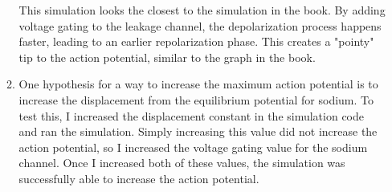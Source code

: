 \documentclass[12pt]{article}
\begin{document}
\begin{enumerate}
\begin{enumerate}
				This simulation looks the closest to the simulation in the book. By adding voltage gating to the leakage channel, the depolarization process happens faster, leading to an earlier repolarization phase. This creates a "pointy" tip to the action potential, similar to the graph in the book.
			
			\item
				One hypothesis for a way to increase the maximum action potential is to increase the displacement from the equilibrium potential for sodium. To test this, I increased the displacement constant in the simulation code and ran the simulation. Simply increasing this value did not increase the action potential, so I increased the voltage gating value for the sodium channel. Once I increased both of these values, the simulation was successfully able to increase the action potential.
			
		\end{enumerate}
  
\end{enumerate}
\end{document}
